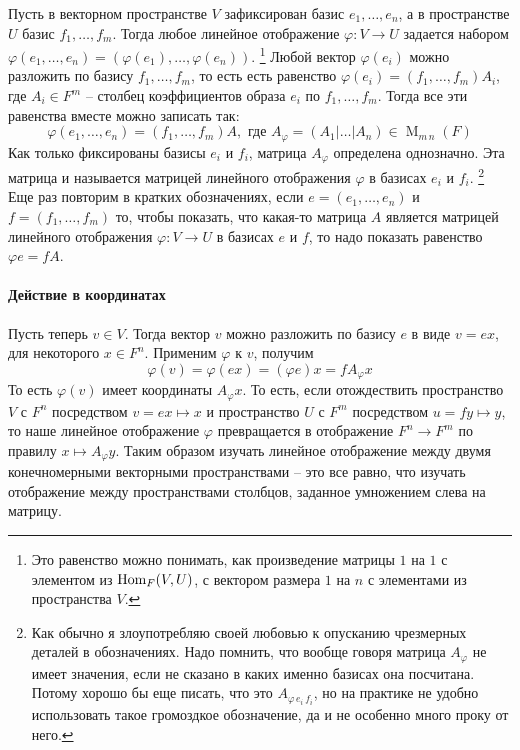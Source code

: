 Пусть в векторном пространстве $V$ зафиксирован базис $e_1,\ldots,e_n$, а в пространстве $U$ базис $f_1,\ldots, f_m$.
Тогда любое линейное отображение $\varphi\colon V\to U$ задается набором $\varphi(e_1,\ldots,e_n) = (\varphi(e_1),\ldots, \varphi(e_n))$.%
\footnote{Это равенство можно понимать, как произведение матрицы $1$ на $1$ с элементом из $\operatorname{Hom}_F(V,U)$, с вектором размера $1$ на $n$ с элементами из пространства $V$.}
Любой вектор $\varphi(e_i)$ можно разложить по базису $f_1,\ldots,f_m$, то есть есть равенство $\varphi(e_i) = (f_1,\ldots,f_m)A_i$, где $A_i\in F^m$ -- столбец коэффициентов образа $e_i$ по $f_1,\ldots,f_m$.
Тогда все эти равенства вместе можно записать так:
\[
\varphi(e_1,\ldots,e_n) = (f_1,\ldots,f_m)A, \text{ где } A_\varphi = (A_1|\ldots|A_n)\in \operatorname{M}_{m\,n}(F)
\]
Как только фиксированы базисы $e_i$ и $f_i$, матрица $A_\varphi$ определена однозначно.
Эта матрица и называется матрицей линейного отображения $\varphi$ в базисах $e_i$ и $f_i$.%
\footnote{Как обычно я злоупотребляю своей любовью к опусканию чрезмерных деталей в обозначениях.
Надо помнить, что вообще говоря матрица $A_\varphi$ не имеет значения, если не сказано в каких именно базисах она посчитана.
Потому хорошо бы еще писать, что это $A_{\varphi\,e_i\,f_i}$, но на практике не удобно использовать такое громоздкое обозначение, да и не особенно много проку от него.}
Еще раз повторим в кратких обозначениях, если $e=(e_1,\ldots,e_n)$ и $f = (f_1,\ldots,f_m)$ то, чтобы показать, что какая-то матрица $A$ является матрицей линейного отображения $\varphi\colon V\to U$ в базисах $e$ и $f$, то надо показать равенство $\varphi e = f A$.

\paragraph{Действие в координатах}

Пусть теперь $v\in V$.
Тогда вектор $v$ можно разложить по базису $e$ в виде $v = ex$, для некоторого $x\in F^n$.
Применим $\varphi$ к $v$, получим
\[
\varphi(v) = \varphi(ex) = (\varphi e)x = f A_\varphi x
\]
То есть $\varphi(v)$ имеет координаты $A_\varphi x$.
То есть, если отождествить пространство $V$ с $F^n$ посредством $v = ex \mapsto x$ и пространство $U$ с $F^m$ посредством $u = fy \mapsto y$, то наше линейное отображение $\varphi$ превращается в отображение $F^n \to F^m$ по правилу $x \mapsto A_\varphi y$.
Таким образом изучать линейное отображение между двумя конечномерными векторными пространствами -- это все равно, что изучать отображение между пространствами столбцов, заданное умножением слева на матрицу.


